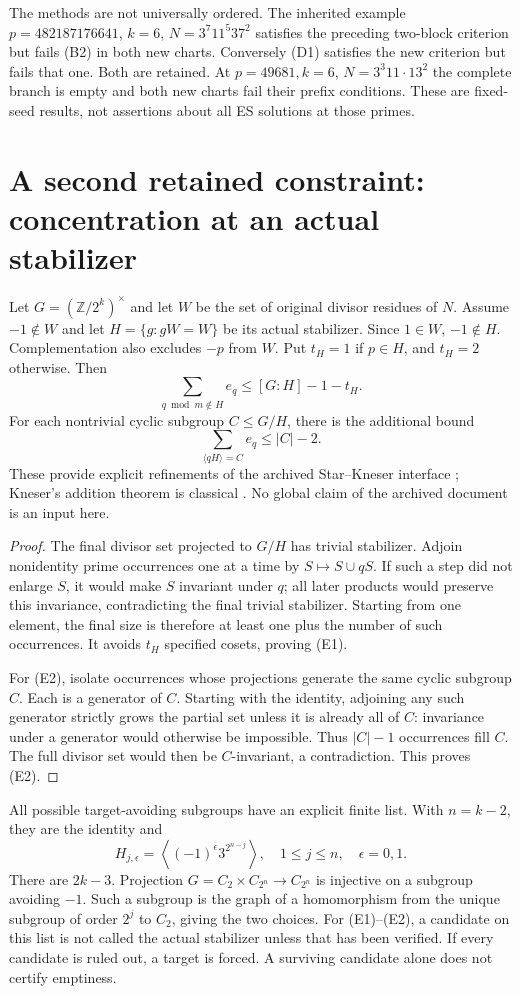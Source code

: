 The methods are not universally ordered. The inherited example
$p=482187176641$, $k=6$, $N=3^7 11^5 37^2$ satisfies the preceding two-block
criterion but fails (B2) in both new charts. Conversely (D1) satisfies the
new criterion but fails that one. Both are retained.
At $p=49681,k=6$, $N=3^3 11\cdot13^2$ the complete branch is empty and
both new charts fail their prefix conditions. These are fixed-seed results,
not assertions about all ES solutions at those primes.

\section{A second retained constraint: concentration at an actual stabilizer}
Let $G=(\mathbb Z/2^k)^\times$ and let $W$ be the set of original divisor
residues of $N$. Assume $-1\notin W$ and let
$H=\{g:gW=W\}$ be its actual stabilizer. Since $1\in W$, $-1\notin H$.
Complementation also excludes $-p$ from $W$. Put
$t_H=1$ if $p\in H$, and $t_H=2$ otherwise.
Then
\[
 \boxed{\sum_{q\bmod m\notin H}e_q\le[G:H]-1-t_H.}         \tag{E1}
\]
For each nontrivial cyclic subgroup $C\le G/H$, there is the additional bound
\[
 \boxed{\sum_{\langle qH\rangle=C}e_q\le |C|-2.}           \tag{E2}
\]
These provide explicit refinements of the archived Star--Kneser interface
\cite{Archive}; Kneser's addition theorem is classical \cite[Theorem 1]{DeVos}.
No global claim of the archived document is an input here.

\begin{proof}
The final divisor set projected to $G/H$ has trivial stabilizer. Adjoin
nonidentity prime occurrences one at a time by $S\mapsto S\cup qS$.
If such a step did not enlarge $S$, it would make $S$ invariant under $q$;
all later products would preserve this invariance, contradicting the final
trivial stabilizer. Starting from one element, the final size is therefore
at least one plus the number of such occurrences. It avoids $t_H$ specified
cosets, proving (E1).

For (E2), isolate occurrences whose projections generate the same cyclic
subgroup $C$. Each is a generator of $C$. Starting with the identity, adjoining
any such generator strictly grows the partial set unless it is already all
of $C$: invariance under a generator would otherwise be impossible.
Thus $|C|-1$ occurrences fill $C$. The full divisor set would then be
$C$-invariant, a contradiction. This proves (E2).
\end{proof}

All possible target-avoiding subgroups have an explicit finite list. With
$n=k-2$, they are the identity and
\[
 \boxed{H_{j,\epsilon}=
 \left\langle(-1)^\epsilon3^{2^{n-j}}\right\rangle,
 \quad1\le j\le n,\quad\epsilon=0,1.}                    \tag{E3}
\]
There are $2k-3$. Projection $G=C_2\times C_{2^n}\to C_{2^n}$ is injective
on a subgroup avoiding $-1$. Such a subgroup is the graph of a homomorphism
from the unique subgroup of order $2^j$ to $C_2$, giving the two choices.
For (E1)--(E2), a candidate on this list is not called the actual stabilizer
unless that has been verified. If every candidate is ruled out, a target is
forced. A surviving candidate alone does not certify emptiness.

